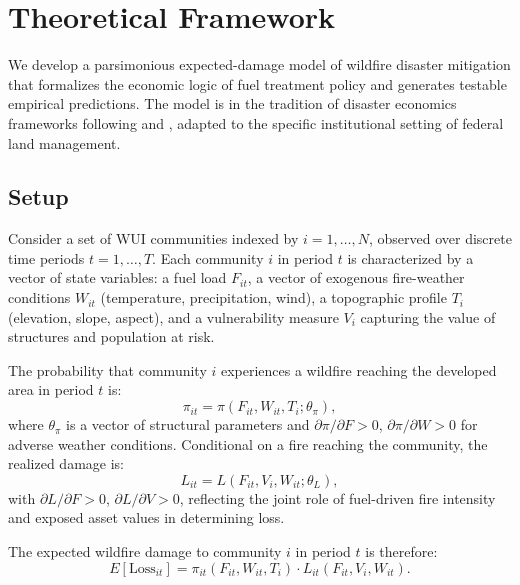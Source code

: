 \documentclass[12pt, letterpaper]{article}
\begin{document}
\section{Theoretical Framework}\label{sec:theory}

We develop a parsimonious expected-damage model of wildfire disaster mitigation that formalizes the economic logic of fuel treatment policy and generates testable empirical predictions. The model is in the tradition of disaster economics frameworks following \citet{kunreuther1996} and \citet{kousky2014}, adapted to the specific institutional setting of federal land management.

\subsection{Setup}

Consider a set of WUI communities indexed by $i = 1, \ldots, N$, observed over discrete time periods $t = 1, \ldots, T$. Each community $i$ in period $t$ is characterized by a vector of state variables: a fuel load $F_{it}$, a vector of exogenous fire-weather conditions $W_{it}$ (temperature, precipitation, wind), a topographic profile $T_i$ (elevation, slope, aspect), and a vulnerability measure $V_i$ capturing the value of structures and population at risk.

The probability that community $i$ experiences a wildfire reaching the developed area in period $t$ is:
\begin{equation}
\pi_{it} = \pi(F_{it}, W_{it}, T_i; \theta_\pi),
\label{eq:fire_prob}
\end{equation}
where $\theta_\pi$ is a vector of structural parameters and $\partial \pi / \partial F > 0$, $\partial \pi / \partial W > 0$ for adverse weather conditions. Conditional on a fire reaching the community, the realized damage is:
\begin{equation}
L_{it} = L(F_{it}, V_i, W_{it}; \theta_L),
\label{eq:damage}
\end{equation}
with $\partial L / \partial F > 0$, $\partial L / \partial V > 0$, reflecting the joint role of fuel-driven fire intensity and exposed asset values in determining loss.

The expected wildfire damage to community $i$ in period $t$ is therefore:
\begin{equation}
E[\text{Loss}_{it}] = \pi_{it}(F_{it}, W_{it}, T_i) \cdot L_{it}(F_{it}, V_i, W_{it}).
\label{eq:expected_loss}
\end{equation}
\end{document}
